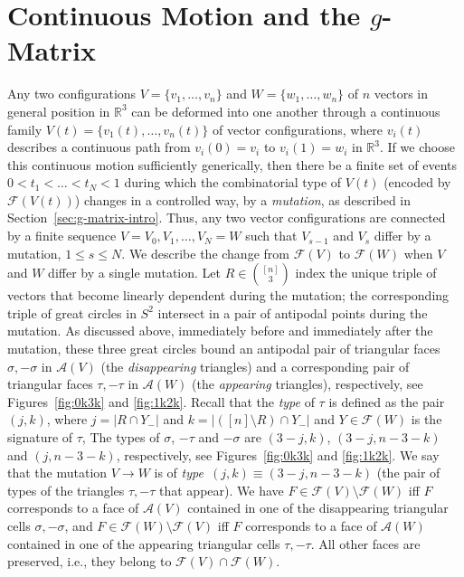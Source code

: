 \documentclass[11pt]{article}
\newcommand{\arr}{\mathcal{A}}
\renewcommand{\leq}{\leqslant}
\newcommand{\R}{\mathbb{R}}
\begin{document}
\section{Continuous Motion and the $g$-Matrix}
\label{sec:g-matrix}
%
Any two configurations $V=\{v_1,\dots,v_n\}$ and $W=\{w_1,\dots,w_n\}$ of $n$ vectors in general position in $\R^3$ can be deformed into one another through a continuous family $V(t)=\{v_1(t),\dots,v_n(t)\}$ of vector configurations, where $v_i(t)$ describes a continuous path from $v_i(0)=v_i$ to $v_i(1)=w_i$ in $\R^3$. If we choose this continuous motion sufficiently generically, then there be a finite set of events $0 < t_1 < \dots < t_N < 1$
during which the combinatorial type of $V(t)$ (encoded by $\mathcal{F}(V(t))$) changes in a controlled way, by a \emph{mutation}, as described in Section~\ref{sec:g-matrix-intro}. Thus, any two vector configurations are connected by a finite sequence $V=V_0,V_1,\dots,V_N=W$ such that $V_{s-1}$ and $V_s$ differ by a mutation, $1\leq s\leq N$. 
%
We describe the change from $\mathcal{F}(V)$ to $\mathcal{F}(W)$ when $V$ and $W$ differ by a single mutation. 
Let $R \in \binom{[n]}{3}$ index the unique triple of vectors that become linearly dependent during the mutation; the corresponding triple of great circles in $S^2$ intersect in a pair of antipodal points during the mutation. As discussed above, immediately before and immediately after the mutation, these three great circles bound an antipodal pair of triangular faces $\sigma,-\sigma$ in $\mathcal{A}(V)$ 
(the \emph{disappearing} triangles) and a corresponding pair of triangular faces $\tau,-\tau$ in $\mathcal{A}(W)$ (the \emph{appearing} triangles), respectively, see Figures~\ref{fig:0k3k} and \ref{fig:1k2k}. 
%
Recall that the \emph{type} of $\tau$ is defined as the pair $(j,k)$, where $j=|R\cap Y_-|$ and $k=|([n]\setminus R)\cap Y_-|$ and $Y\in \mathcal{F}(W)$ is the signature of $\tau$,
The types of $\sigma$, $-\tau$ and $-\sigma$ are $(3-j,k)$, $(3-j,n-3-k)$ and $(j,n-3-k)$, respectively, see Figures~\ref{fig:0k3k} and \ref{fig:1k2k}.
We say that the mutation $V\to W$ is of \emph{type~$(j,k)\equiv(3-j,n-3-k)$} (the pair of types of the triangles $\tau,-\tau$ that appear). 
%
%
We have $F\in \mathcal{F}(V)\setminus \mathcal{F}(W)$ iff $F$ corresponds to a face of $\arr(V)$ contained in one of the disappearing triangular cells $\sigma,-\sigma$, and $F\in \mathcal{F}(W)\setminus \mathcal{F}(V)$ iff $F$ corresponds to a face of $\arr(W)$ contained in one of the appearing triangular cells $\tau,-\tau$. All other faces are preserved, i.e., they belong to $\mathcal{F}(V) \cap \mathcal{F}(W)$. 
\end{document}

